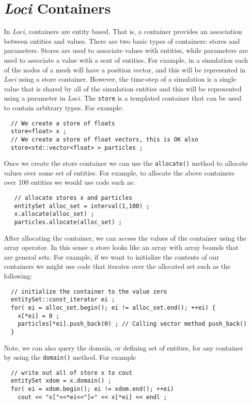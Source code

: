 \documentclass[10pt,epsf,letterpaper,twoside]{book}
\begin{document}


\section{{\it Loci} Containers}

In {\it Loci}, containers are entity based.  That is, a container provides
an association between entities and values.  There are two basic types
of containers: stores and parameters.  Stores are used to associate
values with entities, while parameters are used to associate a value
with a sent of entities.  For example, in a simulation each of the nodes
of a mesh will have a position vector, and this will be represented in
{\it Loci} using a store container.  However, the time-step of a simulation
is a single value that is shared by all of the simulation entities and
this will be represented using a parameter in {\it Loci}.  The {\tt store} is a
templated container that can be used to contain arbitrary types.  For
example:
\begin{verbatim}
  // We create a store of floats
  store<float> x ;
  // We create a store of float vectors, this is OK also
  store<std::vector<float> > particles ;
\end{verbatim}

Once we create the store container we can use the {\tt allocate()}
method to allocate values over some set of entities.  For example, to
allocate the above containers over 100 entities we would use code such
as:
\begin{verbatim}
   // allocate stores x and particles
   entitySet alloc_set = interval(1,100) ;
   x.allocate(alloc_set) ;
   particles.allocate(alloc_set) ;
\end{verbatim}

After allocating the container, we can access the values of the
container using the array operator.  In this sense a store looks like
an array with array bounds that are general sets.  For example, if we
want to initialize the contents of our containers we might use code
that iterates over the allocated set such as the following:
\begin{verbatim}
  // initialize the container to the value zero
  entitySet::const_iterator ei ;
  for( ei = alloc_set.begin(); ei != alloc_set.end(); ++ei) {
    x[*ei] = 0 ;
    particles[*ei].push_back(0) ; // Calling vector method push_back()
  }
\end{verbatim}

Note, we can also query the domain, or defining set of entities, for any container by using the {\tt domain()} method.  For example
\begin{verbatim}
  // write out all of store x to cout
  entitySet xdom = x.domain() ;
  for( ei = xdom.begin(); ei != xdom.end(); ++ei) 
    cout << "x["<<*ei<<"]=" << x[*ei] << endl ;
\end{verbatim}
\end{document}
